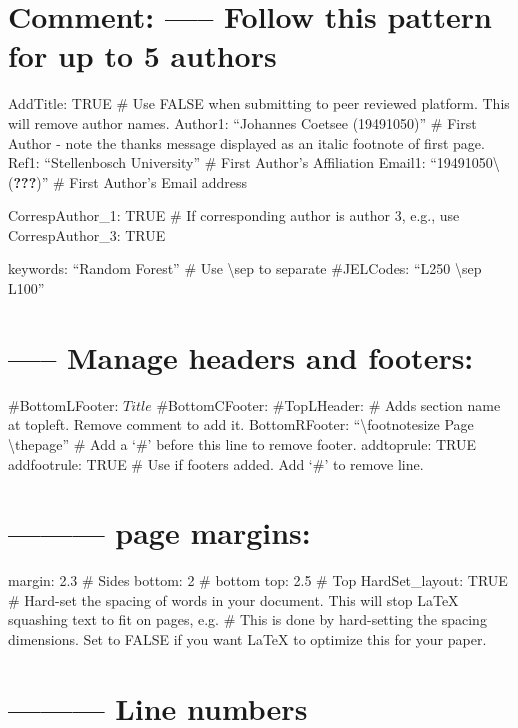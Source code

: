 \documentclass[preprint, authoryear]{article}
\numberwithin{equation}{section}
\numberwithin{figure}{section}
\numberwithin{table}{section}
\begin{document}
\hypertarget{comment-follow-this-pattern-for-up-to-5-authors}{%
\section{Comment: ----- Follow this pattern for up to 5
authors}\label{comment-follow-this-pattern-for-up-to-5-authors}}

AddTitle: TRUE \# Use FALSE when submitting to peer reviewed platform.
This will remove author names. Author1: ``Johannes Coetsee (19491050)''
\# First Author - note the thanks message displayed as an italic
footnote of first page. Ref1: ``Stellenbosch University'' \# First
Author's Affiliation Email1:
``19491050\textbackslash{}({\textbf{???}})'' \# First Author's Email
address

CorrespAuthor\_1: TRUE \# If corresponding author is author 3, e.g., use
CorrespAuthor\_3: TRUE

keywords: ``Random Forest'' \# Use \textbackslash sep to separate
\#JELCodes: ``L250 \textbackslash sep L100''

\hypertarget{manage-headers-and-footers}{%
\section{----- Manage headers and
footers:}\label{manage-headers-and-footers}}

\#BottomLFooter: \(Title\) \#BottomCFooter: \#TopLHeader: \leftmark \#
Adds section name at topleft. Remove comment to add it. BottomRFooter:
``\textbackslash footnotesize Page \textbackslash thepage'' \# Add a
`\#' before this line to remove footer. addtoprule: TRUE addfootrule:
TRUE \# Use if footers added. Add `\#' to remove line.

\hypertarget{page-margins}{%
\section{--------- page margins:}\label{page-margins}}

margin: 2.3 \# Sides bottom: 2 \# bottom top: 2.5 \# Top
HardSet\_layout: TRUE \# Hard-set the spacing of words in your document.
This will stop LaTeX squashing text to fit on pages, e.g. \# This is
done by hard-setting the spacing dimensions. Set to FALSE if you want
LaTeX to optimize this for your paper.

\hypertarget{line-numbers}{%
\section{--------- Line numbers}\label{line-numbers}}
\end{document}

